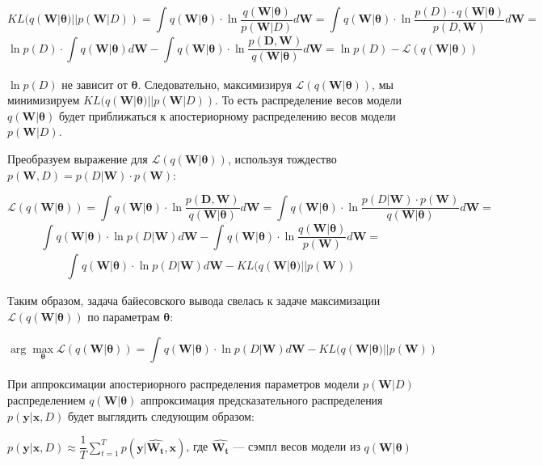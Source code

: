 \documentclass{article}
\newcommand{\argmax}{\arg\!\max}
\begin{document}
\[
KL(q(\mathbf{W} | \pmb{\theta}) || p(\mathbf{W}| D)) =
\int_{}{} q(\mathbf{W} | \pmb{\theta}) \cdot \ln{\dfrac{q(\mathbf{W} | \pmb{\theta})}{p(\mathbf{W}| D)}} d\mathbf{W} =
\int_{}{} q(\mathbf{W} | \pmb{\theta}) \cdot \ln{\dfrac{p(D) \cdot q(\mathbf{W} | \pmb{\theta})}{p(D, \mathbf{W})}} d\mathbf{W} =
\]\[
\ln{p(D)} \cdot \int_{}{} q(\mathbf{W} | \pmb{\theta}) d\mathbf{W} - \int_{}{} q(\mathbf{W} | \pmb{\theta}) \cdot \ln{\dfrac{p(\mathbf{D}, \mathbf{W})}{q(\mathbf{W} | \pmb{\theta})}} d\mathbf{W} =
\ln{p(D)} - \mathcal{L}(q(\mathbf{W} | \pmb{\theta}))
\]

$\ln{p(D)}$ не зависит от $\pmb{\theta}$. Следовательно, максимизируя $\mathcal{L}(q(\mathbf{W} | \pmb{\theta}))$, мы минимизируем $KL(q(\mathbf{W} | \pmb{\theta}) || p(\mathbf{W}| D))$. То есть распределение весов модели $q(\mathbf{W} | \pmb{\theta})$ будет приближаться к апостериорному распределению весов модели $p(\mathbf{W}| D)$.

Преобразуем выражение для $\mathcal{L}(q(\mathbf{W} | \pmb{\theta}))$, используя тождество
$p(\mathbf{W}, D) = p(D | \mathbf{W}) \cdot p(\mathbf{W})$:

\[
\mathcal{L}(q(\mathbf{W} | \pmb{\theta})) =
\int_{}{} q(\mathbf{W} | \pmb{\theta}) \cdot \ln{\dfrac{p(\mathbf{D}, \mathbf{W})}{q(\mathbf{W} | \pmb{\theta})}} d\mathbf{W} =
\int_{}{} q(\mathbf{W} | \pmb{\theta}) \cdot \ln{\dfrac{p(D | \mathbf{W}) \cdot p(\mathbf{W})}{q(\mathbf{W} | \pmb{\theta})}} d\mathbf{W} =
\]\[
\int_{}{} q(\mathbf{W} | \pmb{\theta}) \cdot \ln{p(D | \mathbf{W})} d\mathbf{W} - \int_{}{} q(\mathbf{W} | \pmb{\theta}) \cdot \ln{\dfrac{q(\mathbf{W} | \pmb{\theta})}{p(\mathbf{W})}} d\mathbf{W} =
\]\[
\int_{}{} q(\mathbf{W} | \pmb{\theta}) \cdot \ln{p(D | \mathbf{W})} d\mathbf{W} - KL(q(\mathbf{W} | \pmb{\theta}) || p(\mathbf{W}))
\]

Таким образом, задача байесовского вывода свелась к задаче максимизации $\mathcal{L}(q(\mathbf{W} | \pmb{\theta}))$ по параметрам $\pmb{\theta}$:

\[
\argmax_{\pmb{\theta}} \mathcal{L}(q(\mathbf{W} | \pmb{\theta})) =
\int_{}{} q(\mathbf{W} | \pmb{\theta}) \cdot \ln{p(D | \mathbf{W})} d\mathbf{W} - KL(q(\mathbf{W} | \pmb{\theta}) || p(\mathbf{W}))
\]

При аппроксимации апостериорного распределения параметров модели $p(\mathbf{W}| D)$ распределением $q(\mathbf{W} | \pmb{\theta})$ аппроксимация предсказательного распределения $p(\mathbf{y} | \mathbf{x}, D)$ будет выглядить следующим образом:

$
p(\mathbf{y} | \mathbf{x}, D)
\approx \dfrac{1}{T} \sum_{t=1}^{T}{p(\mathbf{y} | \hat{\mathbf{W_t}}, \mathbf{x})}
$, где $\hat{\mathbf{W_t}}$ --- сэмпл весов модели из $q(\mathbf{W} | \pmb{\theta})$
\end{document}
